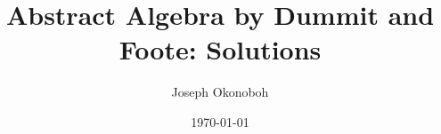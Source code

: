 \documentclass[9pt]{book}
\title{\vspace{-14cm}Abstract Algebra by Dummit and Foote: Solutions}
\author{Joseph Okonoboh}
\date{\today}
\newcommand{\Z}{\mathbb{Z}}
\begin{document}
   \maketitle
\begin{comment}   
   \tableofcontents

   \chapter{Preliminaries}
      \section{Basics}
         
      \section{Properties of the Integers}
         
      \section{$\Z/n\Z$ : The Integers Modulo $n$}
         
   \part{}

   \chapter{Introduction to Groups}
      \section{Basic Axioms and Examples}
         
      \section{Dihedral Groups}
         
      \section{Symmetric Groups}
         
      \section{Matrix Groups}
         
      \section{The Quaternion Group}
         

\end{comment}
\end{document}
